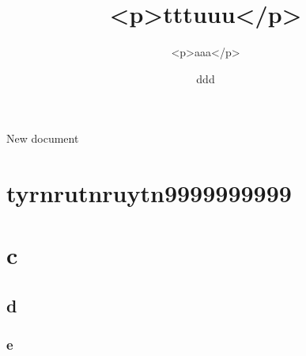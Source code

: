 \documentclass{article}
\begin{document}
\title{<p>tttuuu</p>}
\author{<p>aaa</p>}
\date{ddd}
New document
\maketitle
\section{\textnormal{tyrnrutnruytn9999999999}}
\section{\textnormal{c}}
\subsection{\textnormal{d}}
\subsubsection{\textnormal{e}}
\end{document}
